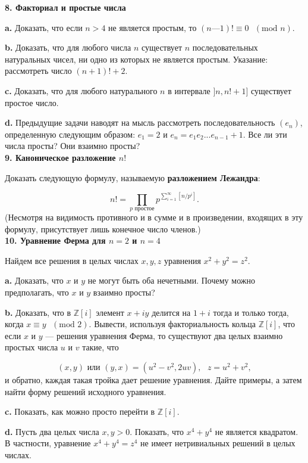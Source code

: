 \noindent \textbf{8. Факториал и простые числа}

\textbf{a.} Доказать, что если $n > 4$ не является простым, то $(n — 1)! \equiv 0 \text{ } (\text{mod } n)$.

\textbf{b.} Доказать, что для любого числа $n$ существует $n$ 
последовательных натуральных чисел, ни одно из которых не является простым. 
Указание: рассмотреть число $(n + 1)! + 2$.

\textbf{c.} Доказать, что для любого натурального $n$ в интервале $]n, n! + 1]$ существует простое число.

\textbf{d.} Предыдущие задачи наводят на мысль рассмотреть 
последовательность $(e_n)$, определенную следующим образом: $e_1 = 2$ и
$e_n = e_1e_2...e_{n-1}+1$. Все ли эти числа просты? Они взаимно просты?
\\

\noindent \textbf{9. Каноническое разложение $n!$}

Доказать следующую формулу, называемую \textbf{разложением Лежандра}:

\[
n! = \prod_{p \text{ простое}} p^{\sum_{i=1}^\infty[n/p^i]}.
\]
(Несмотря на видимость противного и в сумме и в произведении, 
входящих в эту формулу, присутствует лишь конечное число членов.)
\\

\noindent \textbf{10. Уравнение Ферма для $n = 2$ и $n = 4$}

Найдем все решения в целых числах $x, y, z$ уравнения $x^2 + y^2 = z^2$.

\textbf{a.} Доказать, что $x$ и $y$ не могут быть оба нечетными. Почему можно
предполагать, что $x$ и $y$ взаимно просты?

\textbf{b.} Доказать, что в $\mathbb{Z}[i]$ элемент $x + iy$ делится на $1 + i$ тогда и только тогда, когда $x \equiv y \text{ } (\text{mod } 2)$. Вывести, используя факториальность кольца $\mathbb{Z}[i]$, что если $x$ и $y$ — решения уравнения Ферма, то существуют два целых взаимно простых числа $u$ и $v$ такие, что

\[
(x,y) \text{ или } (y,x) = (u^2-v^2, 2uv), \text{ } z=u^2+v^2,
\]
и обратно, каждая такая тройка дает решение уравнения. Дайте 
примеры, а затем найти форму решений исходного уравнения.

\textbf{c.} Показать, как можно просто перейти в $\mathbb{Z}[i]$.

\textbf{d.} Пусть два целых числа $x, y > 0$. Показать, что $x^4 + y^4$ не является квадратом. В частности, уравнение $x^4 + y^4 = z^4$ не имеет 
нетривиальных решений в целых числах.
\\

